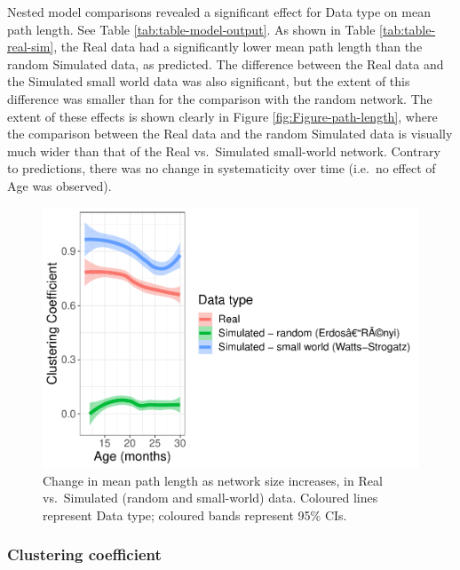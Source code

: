 \documentclass[
  man]{apa6}
\begin{document}
Nested model comparisons revealed a significant effect for Data type on mean path length. See Table \ref{tab:table-model-output}. As shown in Table \ref{tab:table-real-sim}, the Real data had a significantly lower mean path length than the random Simulated data, as predicted. The difference between the Real data and the Simulated small world data was also significant, but the extent of this difference was smaller than for the comparison with the random network. The extent of these effects is shown clearly in Figure \ref{fig:Figure-path-length}, where the comparison between the Real data and the random Simulated data is visually much wider than that of the Real vs.~Simulated small-world network. Contrary to predictions, there was no change in systematicity over time (i.e.~no effect of Age was observed).

\begin{figure}
\centering
\includegraphics{NetworkGraphs_files/figure-latex/Figure-clust-coef-1.pdf}
\caption{\label{fig:Figure-clust-coef}Change in mean path length as network size increases, in Real vs.~Simulated (random and small-world) data. Coloured lines represent Data type; coloured bands represent 95\% CIs.}
\end{figure}

\hypertarget{clustering-coefficient}{%
\subsubsection{Clustering coefficient}\label{clustering-coefficient}}
\end{document}
